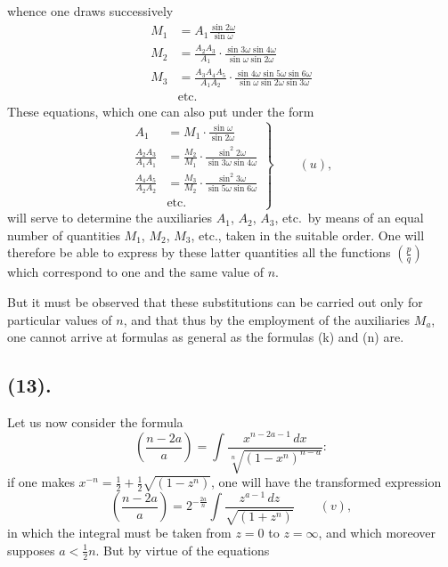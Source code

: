 \documentclass{article}
\begin{document}
whence one draws successively
\[ \begin{aligned} M_{1}&=A_{1}\frac{\sin 2\omega}{\sin\omega}\\ M_{2}&=\frac{A_{2}A_{3}}{A_{1}}\cdot\frac{\sin 3\omega\sin 4\omega}{\sin\omega\sin 2\omega}\\ M_{3}&=\frac{A_{3}A_{4}A_{5}}{A_{1}A_{2}}\cdot\frac{\sin 4\omega\sin 5\omega\sin 6\omega}{\sin\omega\sin 2\omega\sin 3\omega}\\ &\text{etc.} \end{aligned} \]
These equations, which one can also put under the form
\[ \left.\begin{aligned} A_{1}&=M_{1}\cdot\frac{\sin\omega}{\sin 2\omega}\\ \frac{A_{2}A_{3}}{A_{1}A_{1}}&=\frac{M_{2}}{M_{1}}\cdot\frac{\sin^{2}2\omega}{\sin 3\omega\sin 4\omega}\\ \frac{A_{4}A_{5}}{A_{2}A_{2}}&=\frac{M_{3}}{M_{2}}\cdot\frac{\sin^{2}3\omega}{\sin 5\omega\sin 6\omega}\\ &\text{etc.} \end{aligned}\right\}\qquad(u), \]
will serve to determine the auxiliaries $A_{1}$, $A_{2}$, $A_{3}$, etc.\ by means of an equal number of quantities $M_{1}$, $M_{2}$, $M_{3}$, etc., taken in the suitable order. One will therefore be able to express by these latter quantities all the functions $\left(\frac{p}{q}\right)$ which correspond to one and the same value of $n$.

But it must be observed that these substitutions can be carried out only for particular values of $n$, and that thus by the employment of the auxiliaries $M_{a}$, one cannot arrive at formulas as general as the formulas (k) and (n) are.

\subsection*{(13).}

Let us now consider the formula
\[ \left(\frac{n-2a}{a}\right)=\int\frac{x^{n-2a-1}\,dx}{\sqrt[n]{(1-x^{n})^{n-a}}}: \]
if one makes $x^{-n}=\frac{1}{2}+\frac{1}{2}\sqrt{(1-z^{n})}$, one will have the transformed expression
\[ \left(\frac{n-2a}{a}\right)=2^{-\frac{2a}{n}}\int\frac{z^{a-1}\,dz}{\sqrt{(1+z^{n})}}\qquad(v), \]
in which the integral must be taken from $z=0$ to $z=\infty$, and which moreover supposes $a<\frac{1}{2}n$. But by virtue of the equations
\end{document}
